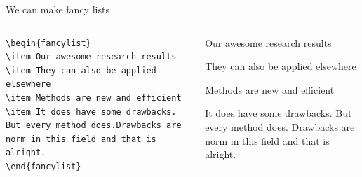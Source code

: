 \documentclass[xetex, aspectratio=169,professionalfont]{beamer}
\begin{document}
\begin{frame}[fragile]{We can make fancy lists}
	\begin{columns}
		\centering
\begin{lstlisting}
\begin{fancylist}
\item Our awesome research results
\item They can also be applied elsewhere
\item Methods are new and efficient
\item It does have some drawbacks. But every method does.Drawbacks are norm in this field and that is alright.
\end{fancylist} 
\end{lstlisting}
	
		\centering
			\begin{fancylist}
			\item Our awesome research results
			\item They can also be applied elsewhere
			\item Methods are new and efficient
			\item It does have some drawbacks. But every method does. Drawbacks are norm in this field and that is alright.
		\end{fancylist} 
	\end{columns}
\end{frame}
\end{document}
